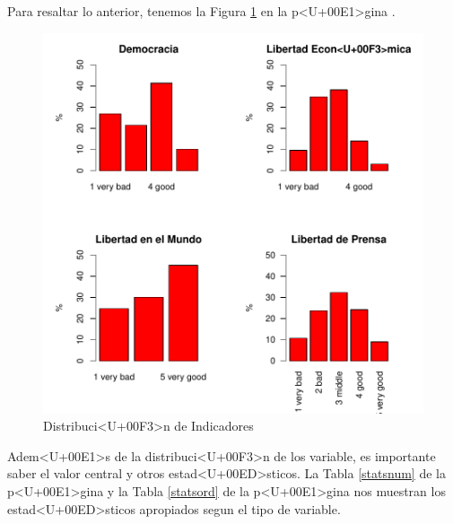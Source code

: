 \documentclass{article}
\begin{document}
\clearpage

Para resaltar lo anterior, tenemos la Figura \ref{barplots} en la p<U+00E1>gina \pageref{barplots}. 


\begin{figure}[h]
\centering
\includegraphics{paperVersion_6-barplots}
\caption{Distribuci<U+00F3>n de Indicadores}
\label{barplots}
\end{figure}

Adem<U+00E1>s de la distribuci<U+00F3>n de los variable, es importante saber el valor central y otros estad<U+00ED>sticos. La Tabla \ref{statsnum} de la p<U+00E1>gina \pageref{statsnum} y la Tabla \ref{statsord} de la p<U+00E1>gina \pageref{statsord} nos muestran los estad<U+00ED>sticos apropiados segun el tipo de variable.
\end{document}
